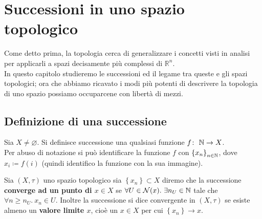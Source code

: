 \section{Successioni in uno spazio topologico}
Come detto prima, la topologia cerca di generalizzare i concetti visti in analisi per applicarli a spazi decisamente più complessi di $\mathbb{R}^n$. \\ In questo capitolo studieremo le successioni ed il legame tra queste e gli spazi topologici; ora che abbiamo ricavato i modi più potenti di descrivere la topologia di uno spazio possiamo occuparcene con libertà di mezzi.



\subsection{\textcolor{TopGener}{\textbf{Definizione di una successione}}}



\begin{definition}
	Sia $X \neq \varnothing$. Si definisce successione una qualsiasi funzione $f \colon\ \mathbb{N} \rightarrow X$. \\ Per abuso di notazione si può identificare la funzione $f$ con $\left\{x_n\right\}_{n\in\mathbb{N}}$, dove $x_i \coloneqq f(i)$ (quindi identifico la funzione con la sua immagine).
\end{definition}

\begin{definition}
	Sia $(X, \tau)$ uno spazio topologico sia $\left\{x_n\right\} \subset X$ diremo che la successione \textbf{converge ad un punto di $x \in X$} se $\forall U \in \mathcal{N}(x).\ \exists n_U \in \mathbb{N}$ tale che $\forall n \ge n_U.\ x_n \in U$. Inoltre la successione si dice convergente in $(X,\tau)$ se esiste almeno un \textbf{valore limite $x$}, cioè un $x \in X$ per cui $\left\{x_n\right\} \rightarrow x$.
\end{definition}

